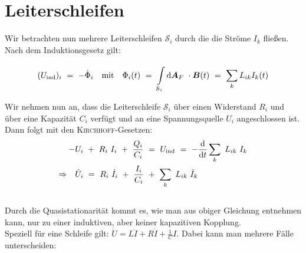 \section{Leiterschleifen}

Wir betrachten nun mehrere Leiterschleifen $\mathcal{S}_i$ durch die  die Ströme $I_k$ fließen. Nach dem Induktionsgesetz gilt:

\begin{equation*}
(U_{\text{ind}})_i  \ = \ -\dot{\Phi}_i \quad \text{mit} \quad \Phi_i (t)  \ = \ \Int{\mathcal{S}_i}{}{\vec{A}_F}\cdot\vec{B}(t)  \ = \ \sum_k L_{ik} I_k(t)
\end{equation*}

Wir nehmen nun an, dass die Leiterschleife $\mathcal{S}_i$ über einen Widerstand $R_i$ und über eine Kapazität $C_i$ verfügt und an eine Spannungsquelle $U_i$ angeschlossen ist. Dann folgt mit den \textsc{Kirchhoff}-Gesetzen:\\

\begin{align*}
- & U_i \ + \ R_i \ I_i \ + \ \frac{Q_i}{C_i} \ = \ U_{\text{ind}}  \ = \ -\diff{}{t} \sum_k \ L_{ik} \ I_k\\
\Rightarrow \quad & \dot{U}_i  \ = \ R_i \ \dot{I}_i \ + \ \frac{I_i}{C_i} \ + \ \sum_k \ L_{ik} \ \ddot{I}_k
\end{align*}
\ \\
Durch die Quasistationarität kommt es, wie man aus obiger Gleichung entnehmen kann, nur zu einer induktiven, aber keiner kapazitiven Kopplung.\\
Speziell für eine Schleife gilt: $\dot{U}=L\ddot{I}+R\dot{I}+\frac{1}{C}I$. Dabei kann man mehrere Fälle unterscheiden:

